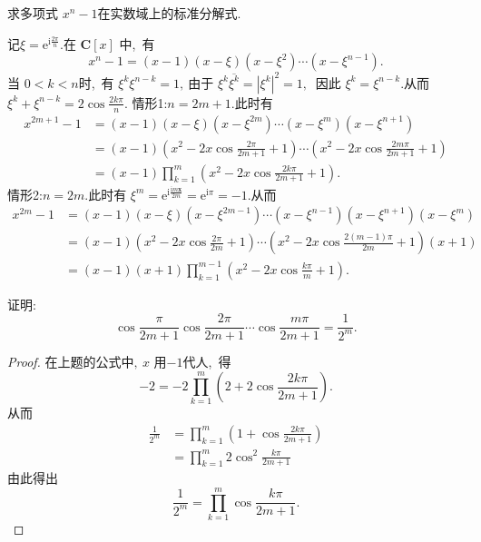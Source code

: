 \newpage
\begin{problem}
	求多项式  $x^{n}-1  $在实数域上的标准分解式.
\end{problem}
\begin{solution}
	记$  \xi=\mathrm{e}^{\mathrm{i} \frac{2 \pi}{n}}  .$在 $ \mathbf{C}[x] $ 中,\  有
	$$x^{n}-1=(x-1)(x-\xi)\left(x-\xi^{2}\right) \cdots\left(x-\xi^{n-1}\right) .$$
	当 $ 0<k<n  $时,\  有  $\xi^{k} \xi^{n-k}=1 ,\  $由于 $ \xi^{k} \overline{\xi^{k}}=\left|\xi^{k}\right|^{2}=1 ,\ $ 因此 $ \xi^{k}=\xi^{n-k}  .$从而  $\xi^{k}+\xi^{n-k}=   2 \cos \frac{2 k \pi}{n}  .$
	情形1:$n=2 m+1  .$此时有
	$$\begin{aligned}
		x^{2 m+1}-1 & =(x-1)(x-\xi)\left(x-\xi^{2 m}\right) \cdots\left(x-\xi^{m}\right)\left(x-\xi^{n+1}\right) \\
		& =(x-1)\left(x^{2}-2 x \cos \frac{2 \pi}{2 m+1}+1\right) \cdots\left(x^{2}-2 x \cos \frac{2 m \pi}{2 m+1}+1\right) \\
		& =(x-1) \prod_{k=1}^{m}\left(x^{2}-2 x \cos \frac{2 k \pi}{2 m+1}+1\right) .
	\end{aligned}$$
	情形2:$n=2 m  .$此时有 $ \xi^{m}=\mathrm{e}^{\mathrm{i} \frac{\mathrm{i} m \boldsymbol{x}}{2 m}}=\mathrm{e}^{\mathrm{i} \pi}=-1  .$从而
	$$\begin{aligned}
		x^{2 m}-1 & =(x-1)(x-\xi)\left(x-\xi^{2 m-1}\right) \cdots\left(x-\xi^{n-1}\right)\left(x-\xi^{n+1}\right)\left(x-\xi^{m}\right) \\
		& =(x-1)\left(x^{2}-2 x \cos \frac{2 \pi}{2 m}+1\right) \cdots\left(x^{2}-2 x \cos \frac{2(m-1) \pi}{2 m}+1\right)(x+1) \\
		& =(x-1)(x+1) \prod_{k=1}^{m-1}\left(x^{2}-2 x \cos \frac{k \pi}{m}+1\right) .
	\end{aligned}$$
\end{solution}
\newpage
\begin{problem}
	证明:
	$$\cos \frac{\pi}{2 m+1} \cos \frac{2 \pi}{2 m+1} \cdots \cos \frac{m \pi}{2 m+1}=\frac{1}{2^{m}} .$$
\end{problem}
\begin{proof}
	在上题的公式中$,\   x $ 用$  -1  $代人,\  得
	$$-2=-2 \prod_{k=1}^{m}\left(2+2 \cos \frac{2 k \pi}{2 m+1}\right).$$
	从而
	$$\begin{aligned}
		\frac{1}{2^{m}} & =\prod_{k=1}^{m}\left(1+\cos \frac{2 k \pi}{2 m+1}\right) \\
		& =\prod_{k=1}^{m} 2 \cos ^{2} \frac{k \pi}{2 m+1}
	\end{aligned}$$
	由此得出
	$$\frac{1}{2^{m}}=\prod_{k=1}^{m} \cos \frac{k \pi}{2 m+1} .$$
\end{proof}
